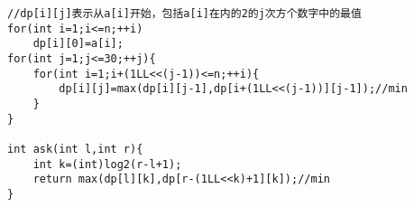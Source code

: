 \begin{lstlisting}
//dp[i][j]表示从a[i]开始，包括a[i]在内的2的j次方个数字中的最值
for(int i=1;i<=n;++i)
	dp[i][0]=a[i];
for(int j=1;j<=30;++j){
	for(int i=1;i+(1LL<<(j-1))<=n;++i){
		dp[i][j]=max(dp[i][j-1],dp[i+(1LL<<(j-1))][j-1]);//min
	}
}

int ask(int l,int r){
	int k=(int)log2(r-l+1);
	return max(dp[l][k],dp[r-(1LL<<k)+1][k]);//min
}
\end{lstlisting}